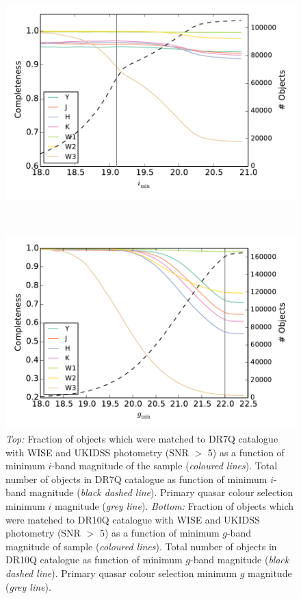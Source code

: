 \begin{figure}
  \centering
  \begin{minipage}[b]{0.75\textwidth}
    \includegraphics[width=\textwidth]{figures/chapter06/dr7completeness_v2}
  \end{minipage} \\
  \begin{minipage}[b]{0.75\textwidth}
    \includegraphics[width=\textwidth]{figures/chapter06/dr10completeness_v2}
  \end{minipage}
  \caption{{\it Top:} Fraction of objects which were matched to DR7Q catalogue with WISE and UKIDSS photometry (SNR $>$ 5) as a function of minimum $i$-band magnitude of the sample ({\it coloured lines}). Total number of objects in DR7Q catalogue as function of minimum $i$-band magnitude ({\it black dashed line}). Primary quasar colour selection minimum $i$ magnitude ({\it grey line}). {\it Bottom:} Fraction of objects which were matched to DR10Q catalogue with WISE and UKIDSS photometry (SNR $>$ 5) as a function of minimum $g$-band magnitude of sample ({\it coloured lines}). Total number of objects in DR10Q catalogue as function of minimum $g$-band magnitude ({\it black dashed line}). Primary quasar colour selection minimum $g$ magnitude ({\it grey line}).}
  \label{fig:completeness}
\end{figure}

